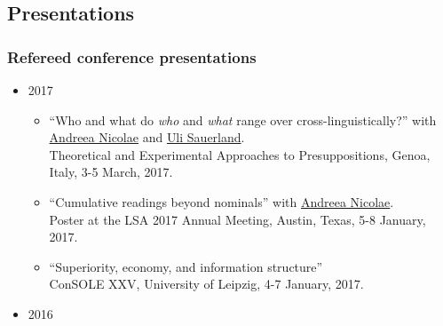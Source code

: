 \documentclass[]{article}
\providecommand{\tightlist}{%
  \setlength{\itemsep}{0pt}\setlength{\parskip}{0pt}}
\begin{document}
\subsection{Presentations}\label{presentations}

\subsubsection{Refereed conference
presentations}\label{refereed-conference-presentations}

\begin{itemize}
\tightlist
\item
  2017

  \begin{itemize}
  \tightlist
  \item
    ``Who and what do \emph{who} and \emph{what} range over
    cross-linguistically?'' with
    \href{https://sites.google.com/site/andreeanicolae/}{Andreea
    Nicolae} and
    \href{http://www.zas.gwz-berlin.de/mitarbeiter_sauerland.html}{Uli
    Sauerland}.\\
    Theoretical and Experimental Approaches to Presuppositions, Genoa,
    Italy, 3-5 March, 2017.
  \item
    ``Cumulative readings beyond nominals'' with
    \href{https://sites.google.com/site/andreeanicolae/}{Andreea
    Nicolae}.\\
    Poster at the LSA 2017 Annual Meeting, Austin, Texas, 5-8 January,
    2017.
  \item
    ``Superiority, economy, and information structure''\\
    ConSOLE XXV, University of Leipzig, 4-7 January, 2017.
  \end{itemize}
\item
  2016


\end{itemize}
\end{document}
